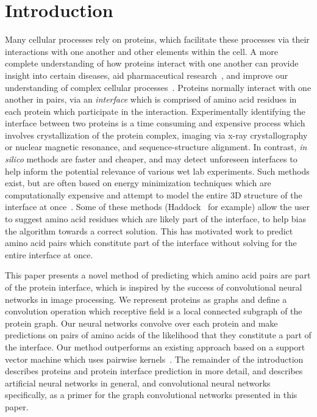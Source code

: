 

\chapter{Introduction}
\label{chap:intro}

Many cellular processes rely on proteins, which facilitate these processes via their interactions with one another and other elements within the cell. 
A more complete understanding of how proteins interact with one another can provide insight into certain diseases, aid pharmaceutical research~\cite{fauman2003}, and improve our understanding of complex cellular processes~\cite{altman2003}.
Proteins normally interact with one another in pairs, via an \textit{interface} which is comprised of amino acid residues in each protein which participate in the interaction.
Experimentally identifying the interface between two proteins is a time consuming and expensive process which involves crystallization of the protein complex, imaging via x-ray crystallography or nuclear magnetic resonance, and sequence-structure alignment. 
In contrast, \textit{in silico} methods are faster and cheaper, and may detect unforeseen interfaces to help inform the potential relevance of various wet lab experiments.
Such methods exist, but are often based on energy minimization techniques which are computationally expensive and attempt to model the entire 3D structure of the interface at once~\cite{esmaielbeiki2015}.
Some of these methods (Haddock~\cite{zundert2016} for example) allow the user to suggest amino acid residues which are likely part of the interface, to help bias the algorithm towards a correct solution.
This has motivated work to predict amino acid pairs which constitute part of the interface without solving for the entire interface at once. 

This paper presents a novel method of predicting which amino acid pairs are part of the protein interface, which is inspired by the success of convolutional neural networks in image processing. 
We represent proteins as graphs and define a convolution operation which receptive field is a local connected subgraph of the protein graph.
Our neural networks convolve over each protein and make predictions on pairs of amino acids of the likelihood that they constitute a part of the interface. 
Our method outperforms an existing approach based on a support vector machine which uses pairwise kernels~\cite{minhas2014}.
The remainder of the introduction describes proteins and protein interface prediction in more detail, and describes artificial neural networks in general, and convolutional neural networks specifically, as a primer for the graph convolutional networks presented in this paper.

